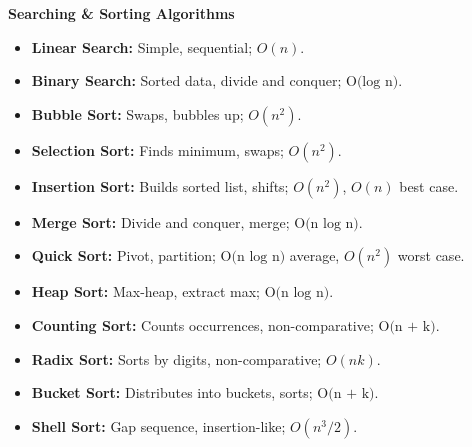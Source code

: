 \documentclass[
  letterpaper,
  DIV=11,
  numbers=noendperiod]{scrreprt}
\providecommand{\tightlist}{%
  \setlength{\itemsep}{0pt}\setlength{\parskip}{0pt}}
\begin{document}
\begin{tcolorbox}[enhanced jigsaw, colframe=quarto-callout-note-color-frame, toprule=.15mm, bottomrule=.15mm, rightrule=.15mm, colback=white, breakable, arc=.35mm, opacityback=0, left=2mm, leftrule=.75mm]

\vspace{-3mm}\textbf{Searching \& Sorting Algorithms}\vspace{3mm}

\begin{itemize}
\tightlist
\item
  \textbf{Linear Search:} Simple, sequential; \(O(n)\).
\item
  \textbf{Binary Search:} Sorted data, divide and conquer;
  \(\text{O(log n)}\).
\item
  \textbf{Bubble Sort:} Swaps, bubbles up; \(O(n^2)\).
\item
  \textbf{Selection Sort:} Finds minimum, swaps; \(O(n^2)\).
\item
  \textbf{Insertion Sort:} Builds sorted list, shifts; \(O(n^2)\),
  \(O(n)\) best case.
\item
  \textbf{Merge Sort:} Divide and conquer, merge; \(\text{O(n log n)}\).
\item
  \textbf{Quick Sort:} Pivot, partition; \(\text{O(n log n)}\) average,
  \(O(n^2)\) worst case.
\item
  \textbf{Heap Sort:} Max-heap, extract max; \(\text{O(n log n)}\).
\item
  \textbf{Counting Sort:} Counts occurrences, non-comparative;
  \(\text{O(n + k)}\).
\item
  \textbf{Radix Sort:} Sorts by digits, non-comparative; \(O(nk)\).
\item
  \textbf{Bucket Sort:} Distributes into buckets, sorts;
  \(\text{O(n + k)}\).
\item
  \textbf{Shell Sort:} Gap sequence, insertion-like; \(O(n^3/2)\).
\end{itemize}

\end{tcolorbox}
\end{document}

